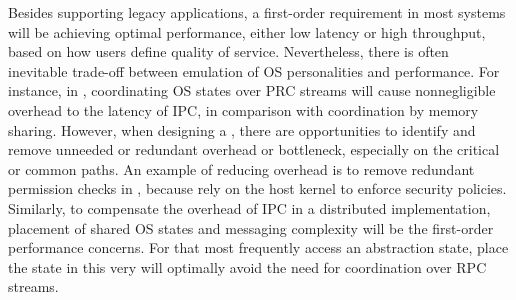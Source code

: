%
%


Besides supporting legacy applications,
a first-order requirement in most systems will be achieving
optimal performance, either low latency or high throughput,
based on how users define quality of service.
Nevertheless, there is often inevitable trade-off between emulation of OS personalities
and performance.
For instance, in \graphene{}, coordinating OS states %
over PRC streams
will cause nonnegligible overhead to the latency of IPC,
in comparison with coordination by memory sharing. %
However, when designing a \libos{},
there are opportunities to identify and remove unneeded or redundant
overhead or bottleneck,
especially on the critical or common paths.
An example of reducing overhead
is to remove redundant permission checks in \liboses{},
because \picoprocs{} rely on the host kernel to enforce security policies.
Similarly, to compensate the overhead of IPC
in a distributed implementation, placement of shared OS states and messaging complexity
will be the first-order performance concerns.
For \picoprocs{} that most frequently access an abstraction state,
place the state in this very \picoproc{}
will optimally avoid the need for coordination over RPC streams.


